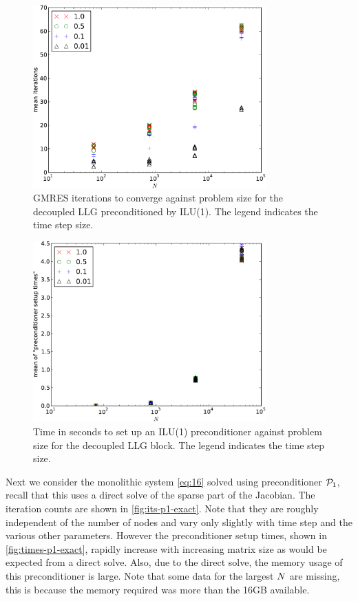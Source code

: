 \begin{figure}
  \centering
  \includegraphics[width=0.8\textwidth]{plots/linear_solvers/ilu-1decoupleddummy-meanofnsolveritersvsinitialnnode.pdf}
  \caption{GMRES iterations to converge against problem size for the decoupled LLG preconditioned by ILU(1). The legend indicates the time step size.}
  \label{fig:its-ilu-decoupled}
\end{figure}

\begin{figure}
  \centering
  \includegraphics[width=0.8\textwidth]{plots/linear_solvers/ilu-1decoupleddummy-meanofpreconditionersetuptimesvsinitialnnode.pdf}
  \caption{Time in seconds to set up an ILU(1) preconditioner against problem size for the decoupled LLG block. The legend indicates the time step size.}
  \label{fig:times-ilu-decoupled}
\end{figure}


Next we consider the monolithic system \cref{eq:16} solved using preconditioner $\mathcal{P}_1$, recall that this uses a direct solve of the sparse part of the Jacobian.
The iteration counts are shown in \cref{fig:its-p1-exact}.
Note that they are roughly independent of the number of nodes and vary only slightly with time step and the various other parameters.
However the preconditioner setup times, shown in \cref{fig:times-p1-exact}, rapidly increase with increasing matrix size as would be expected from a direct solve.
Also, due to the direct solve, the memory usage of this preconditioner is large.
Note that some data for the largest $N$ are missing, this is because the memory required was more than the 16GB available.

